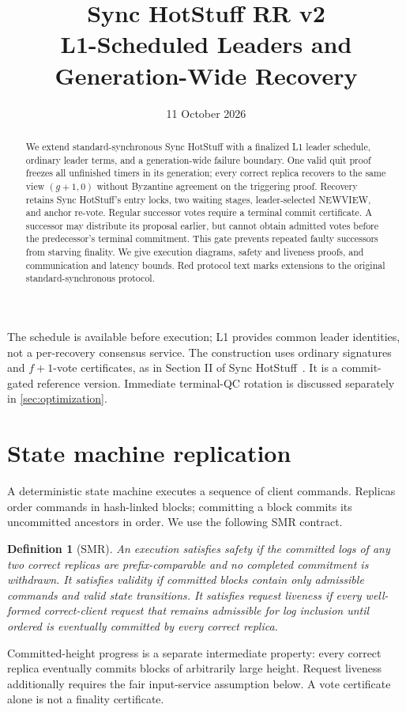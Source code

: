\documentclass[11pt,a4paper]{article}
\title{Sync HotStuff RR v2\\\large L1-Scheduled Leaders and Generation-Wide Recovery}
\author{}\date{11 October 2026}
\newtheorem{definition}{Definition}[section]
\newcounter{protocol}
\begin{document}
\maketitle
\begin{abstract}
We extend standard-synchronous Sync HotStuff with a finalized L1 leader
schedule, ordinary leader terms, and a generation-wide failure boundary.
One valid quit proof freezes all unfinished timers in its generation;
every correct replica recovers to the same view $(g+1,0)$ without Byzantine
agreement on the triggering proof. Recovery retains Sync HotStuff's entry
locks, two waiting stages, leader-selected NEWVIEW, and anchor re-vote.
Regular successor votes require a terminal commit certificate. A successor
may distribute its proposal earlier, but cannot obtain admitted votes before
the predecessor's terminal commitment. This gate prevents repeated faulty
successors from starving finality. We give execution diagrams, safety and
liveness proofs, and communication and latency bounds. Red protocol text
marks extensions to the original standard-synchronous protocol.
\end{abstract}
The schedule is available before execution; L1 provides common leader
identities, not a per-recovery consensus service. The construction uses
ordinary signatures and $f+1$-vote certificates, as in Section II of
Sync HotStuff~\cite{sync}. It is a commit-gated reference version.
Immediate terminal-QC rotation is discussed separately in
\cref{sec:optimization}.

\section{State machine replication}
\label{sec:smr}
A deterministic state machine executes a sequence of client commands.
Replicas order commands in hash-linked blocks; committing a block commits
its uncommitted ancestors in order. We use the following SMR contract.
\begin{definition}[SMR]
An execution satisfies \emph{safety} if the committed logs of any two correct
replicas are prefix-comparable and no completed commitment is withdrawn.
It satisfies \emph{validity} if committed blocks contain only admissible
commands and valid state transitions. It satisfies \emph{request liveness}
if every well-formed correct-client request that remains admissible for log
inclusion until ordered is eventually committed by every correct replica.
\end{definition}
Committed-height progress is a separate intermediate property: every
correct replica eventually commits blocks of arbitrarily large height.
Request liveness additionally requires the fair input-service assumption
below. A vote certificate alone is not a finality certificate.
\end{document}
